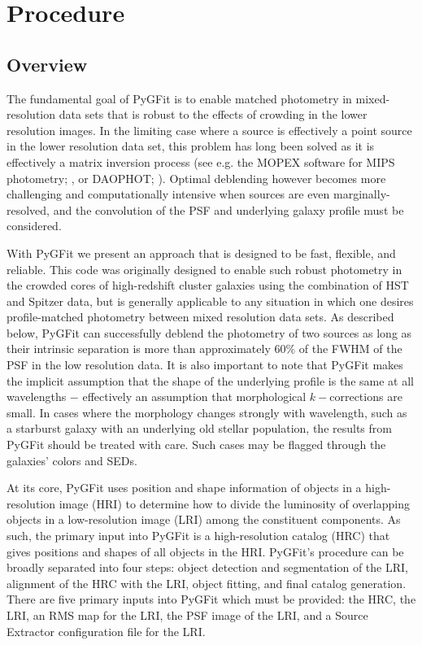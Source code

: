 \documentclass[preprint]{aastex}
\newcommand{\pygfit}{PyGFit}
\newcommand{\extractor}{Source Extractor}
\begin{document}
\section{Procedure}\label{sec:procedure}

\subsection{Overview}

The fundamental goal of \pygfit{} is to enable matched photometry in mixed-resolution data sets that is robust to the effects of crowding in the lower resolution images. In the limiting case where a source is effectively a point source in the lower resolution data set, this problem has long been solved as it is effectively a matrix inversion process (see e.g. the MOPEX software for MIPS photometry; \citealt{mopex}, or DAOPHOT; \citealt{stetson87}). Optimal deblending however becomes more challenging and computationally intensive when sources are even marginally-resolved, and the convolution of the PSF and underlying galaxy profile must be considered. 

With \pygfit{} we present an approach that is designed to be fast, flexible, and reliable. This code was originally designed to enable such robust photometry in the crowded cores of high-redshift cluster galaxies using the combination of HST and Spitzer data, but is generally applicable to any situation in which one desires profile-matched photometry between mixed resolution data sets. As described below, \pygfit{} can successfully deblend the photometry of two sources as long as their intrinsic separation is more than approximately $60\%$ of the FWHM of the PSF in the low resolution data.  It is also important to note that \pygfit{} makes the implicit assumption that the shape of the underlying profile is the same at all wavelengths $-$ effectively an assumption that morphological $k-$corrections are small. In cases where the morphology changes strongly with wavelength, such as a starburst galaxy with an underlying old stellar population, the results from \pygfit{} should be treated with care.  Such cases may be flagged through the galaxies' colors and SEDs.

At its core, \pygfit{} uses position and shape information of objects in a high-resolution image (HRI) to determine how to divide the luminosity of overlapping objects in a low-resolution image (LRI) among the constituent components.  As such, the primary input into \pygfit{} is a high-resolution catalog (HRC) that gives positions and shapes of all objects in the HRI.  \pygfit{}'s procedure can be broadly separated into four steps: object detection and segmentation of the LRI, alignment of the HRC with the LRI, object fitting, and final catalog generation.  There are five primary inputs into \pygfit{} which must be provided: the HRC, the LRI, an RMS map for the LRI, the PSF image of the LRI, and a \extractor{} configuration file for the LRI.
\end{document}

